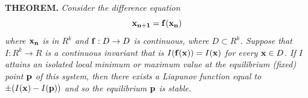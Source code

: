\documentclass{article}
\begin{document}
{\bf THEOREM.} {\it Consider the  difference equation
$${\bf x_{n+1}}={\bf f( x_n)}$$
where ${\bf x_n}$ is in $R^k$ and ${\bf f}: D\to D$ is continuous, where
$D \subset R^k$. Suppose that $I:R^k\to R$ is a continuous invariant that is
$I({\bf f(x)})=I({\bf x})$
for every ${\bf x}\in D$. If $I$ attains an isolated local minimum or maximum value
at the equilibrium (fixed) point ${\bf p}$  of this system, then there exists a
Liapunov function equal to  $\pm(I({\bf x}) - I({\bf p}))$ and so the equilibrium
${\bf p}$ is stable.}
\end{document}
